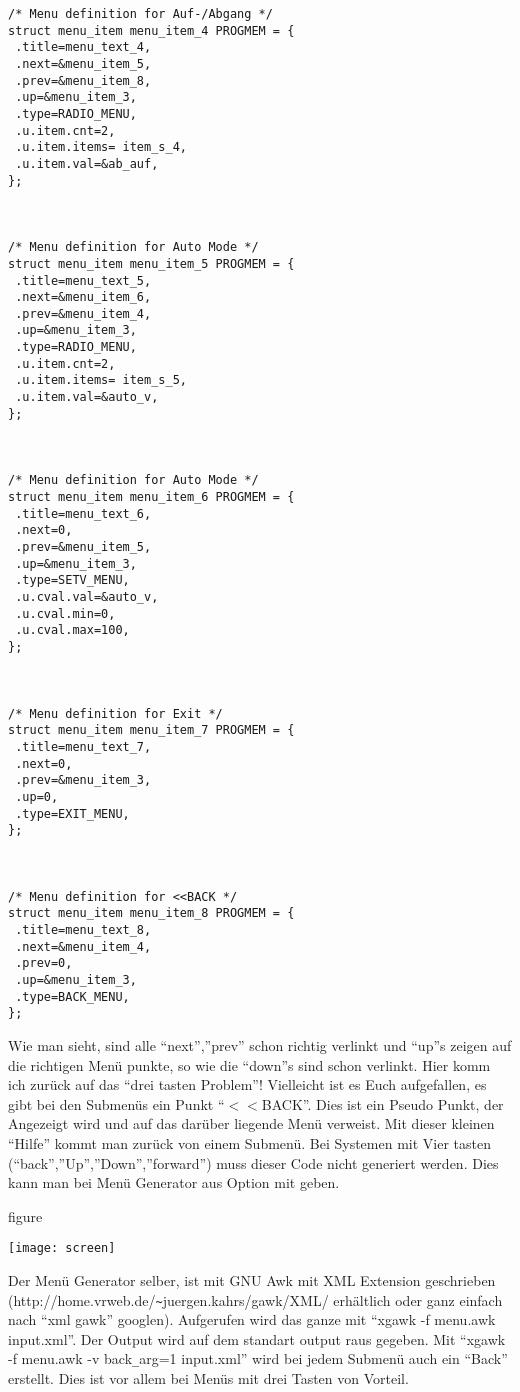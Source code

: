 \documentclass[a4paper]{article}
\begin{document}
\begin{tiny}
\begin{lstlisting}[label=fig:c,caption={}]
/* Menu definition for Auf-/Abgang */
struct menu_item menu_item_4 PROGMEM = {
 .title=menu_text_4,
 .next=&menu_item_5,
 .prev=&menu_item_8,
 .up=&menu_item_3,
 .type=RADIO_MENU,
 .u.item.cnt=2,
 .u.item.items= item_s_4,
 .u.item.val=&ab_auf,
};



/* Menu definition for Auto Mode */
struct menu_item menu_item_5 PROGMEM = {
 .title=menu_text_5,
 .next=&menu_item_6,
 .prev=&menu_item_4,
 .up=&menu_item_3,
 .type=RADIO_MENU,
 .u.item.cnt=2,
 .u.item.items= item_s_5,
 .u.item.val=&auto_v,
};



/* Menu definition for Auto Mode */
struct menu_item menu_item_6 PROGMEM = {
 .title=menu_text_6,
 .next=0,
 .prev=&menu_item_5,
 .up=&menu_item_3,
 .type=SETV_MENU,
 .u.cval.val=&auto_v,
 .u.cval.min=0,
 .u.cval.max=100,
};



/* Menu definition for Exit */
struct menu_item menu_item_7 PROGMEM = {
 .title=menu_text_7,
 .next=0,
 .prev=&menu_item_3,
 .up=0,
 .type=EXIT_MENU,
};



/* Menu definition for <<BACK */
struct menu_item menu_item_8 PROGMEM = {
 .title=menu_text_8,
 .next=&menu_item_4,
 .prev=0,
 .up=&menu_item_3,
 .type=BACK_MENU,
};

\end{lstlisting}
\end{tiny}
Wie man sieht, sind alle ``next'',''prev'' schon richtig verlinkt und ``up''s zeigen auf die richtigen Menü punkte, so wie die ``down''s sind schon verlinkt. Hier komm ich zurück auf das ``drei tasten Problem''! Vielleicht ist es Euch aufgefallen, es gibt bei den Submen\"us ein Punkt ``$<<$BACK''. Dies ist ein Pseudo Punkt, der Angezeigt wird und auf das darüber liegende Menü verweist. Mit dieser kleinen ``Hilfe'' kommt man zurück von einem Submen\"u. Bei Systemen mit Vier tasten (``back'',''Up'',''Down'',''forward'') muss dieser Code nicht generiert werden. Dies kann man bei Menü Generator aus Option mit geben.


 \begin{nofloat}{figure}
\begin{center}

\texttt{[image: screen]}

\label{fig:screen}
\caption{Screenshoot von Menü Systems unter Linux}
\end{center}
\end{nofloat} 


Der Men\"u Generator selber, ist mit GNU Awk mit XML Extension geschrieben (http://home.vrweb.de/\verb|~|juergen.kahrs/gawk/XML/ erhältlich oder ganz einfach nach ``xml gawk'' googlen). 
Aufgerufen wird das ganze mit ``xgawk -f menu.awk input.xml''. Der Output wird auf dem standart output raus gegeben. Mit ``xgawk -f menu.awk -v back\verb|_|arg=1 input.xml'' wird bei jedem Submenü auch ein ``Back'' erstellt. Dies ist vor allem bei Menüs mit drei Tasten von Vorteil.
\end{document}
